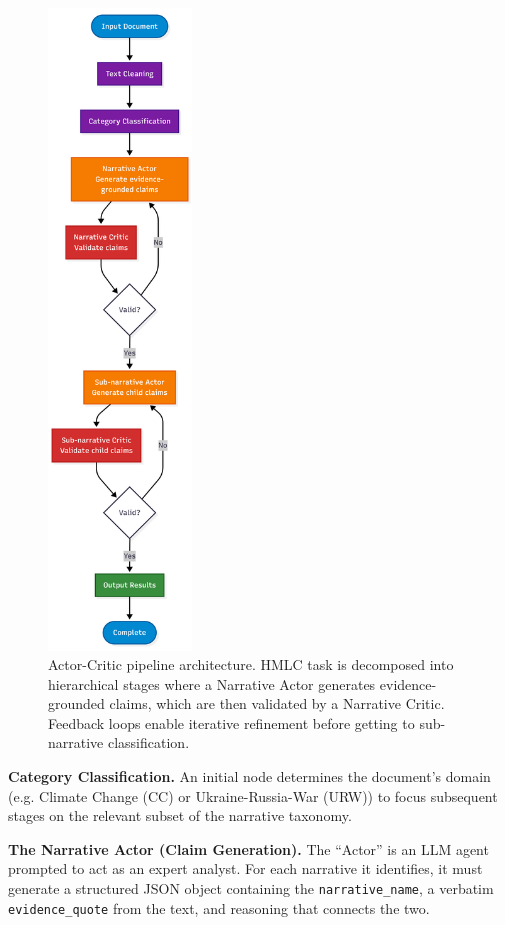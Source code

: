 \begin{figure}[!ht]
\centering
\includegraphics[height=17cm]{assets/diagrams/actor-critique.png}
\caption{Actor-Critic pipeline architecture. HMLC task is decomposed into hierarchical stages where a Narrative Actor generates evidence-grounded claims, which are then validated by a Narrative Critic. Feedback loops enable iterative refinement before getting to sub-narrative classification.}
\label{fig:actor_critic_pipeline}
\end{figure}

\textbf{Category Classification.} 
An initial node determines the document's domain (e.g. Climate Change (CC) or Ukraine-Russia-War (URW)) to focus subsequent stages on the relevant subset of the narrative taxonomy.

\textbf{The Narrative Actor (Claim Generation).}
The ``Actor'' is an LLM agent prompted to act as an expert analyst. For each narrative it identifies, it must generate a structured JSON object containing the \texttt{narrative\_name}, a verbatim \texttt{evidence\_quote} from the text, and reasoning that connects the two.

